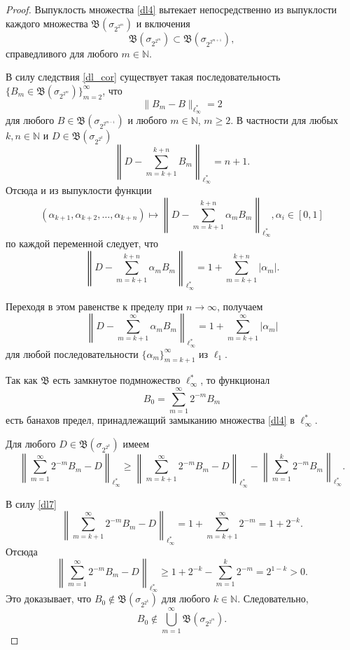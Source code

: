 \documentclass[12pt]{article}
\def\N{{\mathbb{N}}}
\def\B{{\mathfrak{B}}}
\begin{document}
\begin{proof}
Выпуклость множества \eqref{dl4} вытекает непосредственно из выпуклости каждого множества $\mathfrak B(\sigma_{2^{2^m}})$ и включения
\begin{equation}\label{dl5}
\mathfrak B(\sigma_{2^{2^m}}) \subset \mathfrak B(\sigma_{2^{2^{m+1}}})
,
\end{equation}
справедливого для любого $m\in \N$.

В силу следствия \ref{dl_cor} существует такая последовательность $\{B_m \in \mathfrak B(\sigma_{2^{2^m}})\}_{m=2}^\infty$, что
\begin{equation}\label{dl6}
\|B_m-B\|_{\ell_\infty^*}=2
\end{equation}
для любого $B \in \mathfrak B(\sigma_{2^{2^{m-1}}})$ и любого $m\in \N$, $m\geqslant2$. В частности для любых $k,n\in\N$ и $D\in \mathfrak B(\sigma_{2^{2^k}})$
$$\left\|D-\sum_{m=k+1}^{k+n}B_m\right\|_{\ell_\infty^*}=n+1.$$
Отсюда и из выпуклости функции
$$(\alpha_{k+1}, \alpha_{k+2}, \dots, \alpha_{k+n}) \mapsto \left\|D-\sum_{m=k+1}^{k+n}\alpha_mB_m\right\|_{\ell_\infty^*}, \alpha_i \in[0,1]$$
по каждой переменной следует, что
$$\left\|D-\sum_{m=k+1}^{k+n}\alpha_mB_m\right\|_{\ell_\infty^*} = 1+ \sum_{m=k+1}^{k+n}|\alpha_m|. $$

Переходя в этом равенстве к пределу при $n\to\infty$, получаем
\begin{equation}\label{dl7}
\left\|D-\sum_{m=k+1}^\infty\alpha_mB_m\right\|_{\ell_\infty^*} = 1+ \sum_{m=k+1}^\infty|\alpha_m|
\end{equation}
для любой последовательности $\{\alpha_m\}_{m=k+1}^\infty$ из $\ell_1$.

Так как $\B$ есть замкнутое подмножество $\ell_\infty^*$, то функционал
$$B_0=\sum_{m=1}^\infty 2^{-m}B_m$$
есть банахов предел, принадлежащий замыканию множества \eqref{dl4} в $\ell_\infty^*$.

Для любого $D\in \mathfrak B(\sigma_{2^{2^k}})$ имеем
$$\left\|\sum_{m=1}^\infty 2^{-m}B_m-D\right\|_{\ell_\infty^*}\geqslant \left\|\sum_{m=k+1}^\infty 2^{-m}B_m-D\right\|_{\ell_\infty^*}-\left\|\sum_{m=1}^k 2^{-m}B_m\right\|_{\ell_\infty^*}.$$

В силу \eqref{dl7}
$$\left\|\sum_{m=k+1}^\infty 2^{-m}B_m-D\right\|_{\ell_\infty^*} = 1+ \sum_{m=k+1}^\infty 2^{-m}=1+2^{-k}.$$
Отсюда
$$\left\|\sum_{m=1}^\infty 2^{-m}B_m-D\right\|_{\ell_\infty^*}\geqslant 1+2^{-k} - \sum_{m=1}^k 2^{-m}= 2^{1-k}>0.$$
Это доказывает, что $B_0\notin \mathfrak B(\sigma_{2^{2^k}})$ для любого $k\in\N$. Следовательно,
$$B_0\notin \bigcup_{m=1}^\infty\mathfrak B(\sigma_{2^{2^m}}).$$
\end{proof}
\end{document}
